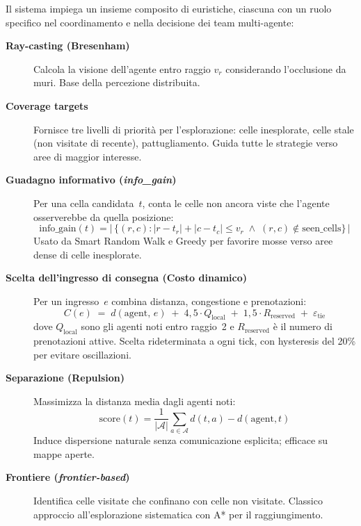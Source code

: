 Il sistema impiega un insieme composito di euristiche, ciascuna con un ruolo specifico
nel coordinamento e nella decisione dei team multi-agente:

\begin{description}
  \item[\textbf{Ray-casting (Bresenham)}]
        Calcola la visione dell'agente entro raggio $v_r$ considerando l'occlusione
        da muri. Base della percezione distribuita.
  
  \item[\textbf{Coverage targets}]
        Fornisce tre livelli di priorit\`a per l'esplorazione: celle inesplorate,
        celle stale (non visitate di recente), pattugliamento. Guida tutte le strategie
        verso aree di maggior interesse.
  
  \item[\textbf{Guadagno informativo (\textit{info\_gain})}]
        Per una cella candidata~$t$, conta le celle non ancora viste che l'agente
        osserverebbe da quella posizione:
        $$\text{info\_gain}(t) = \bigl|\,\{(r,c) : |r - t_r| + |c - t_c| \le v_r
        \;\wedge\; (r,c) \notin \text{seen\_cells}\}\,\bigr|$$
        Usato da Smart Random Walk e Greedy per favorire mosse verso aree dense
        di celle inesplorate.
  
  \item[\textbf{Scelta dell'ingresso di consegna (Costo dinamico)}]
        Per un ingresso~$e$ combina distanza, congestione e prenotazioni:
        $$C(e) \;=\; d(\text{agent},\,e) \;+\; 4{,}5\cdot Q_{\text{local}}
        \;+\; 1{,}5\cdot R_{\text{reserved}} \;+\; \varepsilon_{\text{tie}}$$
        dove $Q_{\text{local}}$ sono gli agenti noti entro raggio~2 e $R_{\text{reserved}}$
        \`e il numero di prenotazioni attive. Scelta rideterminata a ogni tick, con hysteresis
        del 20\% per evitare oscillazioni.
  
  \item[\textbf{Separazione (Repulsion)}]
        Massimizza la distanza media dagli agenti noti:
        $$\text{score}(t) = \frac{1}{|\mathcal{A}|}\sum_{a \in \mathcal{A}} d(t, a) - d(\text{agent}, t)$$
        Induce dispersione naturale senza comunicazione esplicita; efficace su mappe aperte.
  
  \item[\textbf{Frontiere (\textit{frontier-based})}]
        Identifica celle visitate che confinano con celle non visitate. Classico
        approccio all'esplorazione sistematica con A* per il raggiungimento.
  

\end{description}
